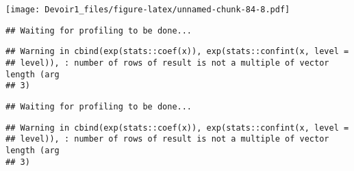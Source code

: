 \documentclass[]{article}
\newenvironment{Shaded}{\begin{snugshade}}{\end{snugshade}}
\newcommand{\KeywordTok}[1]{\textcolor[rgb]{0.13,0.29,0.53}{\textbf{#1}}}
\newcommand{\DataTypeTok}[1]{\textcolor[rgb]{0.13,0.29,0.53}{#1}}
\newcommand{\DecValTok}[1]{\textcolor[rgb]{0.00,0.00,0.81}{#1}}
\newcommand{\StringTok}[1]{\textcolor[rgb]{0.31,0.60,0.02}{#1}}
\newcommand{\OperatorTok}[1]{\textcolor[rgb]{0.81,0.36,0.00}{\textbf{#1}}}
\newcommand{\NormalTok}[1]{#1}
\begin{document}
\texttt{[image: Devoir1\_files/figure-latex/unnamed-chunk-84-8.pdf]}

\begin{Shaded}
\end{Shaded}

\begin{verbatim}
## Waiting for profiling to be done...
\end{verbatim}

\begin{verbatim}
## Warning in cbind(exp(stats::coef(x)), exp(stats::confint(x, level =
## level)), : number of rows of result is not a multiple of vector length (arg
## 3)
\end{verbatim}

\begin{verbatim}
## Waiting for profiling to be done...
\end{verbatim}

\begin{verbatim}
## Warning in cbind(exp(stats::coef(x)), exp(stats::confint(x, level =
## level)), : number of rows of result is not a multiple of vector length (arg
## 3)
\end{verbatim}
\end{document}
